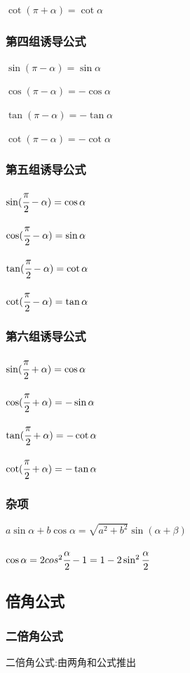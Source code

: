 \documentclass[UTF8,12pt]{ctexbook}
\begin{document}
{{{{    $\cot(\pi + \alpha) = \cot\alpha$
  }%

  \subsubsection{第四组诱导公式}{
    $\sin(\pi - \alpha) = \sin\alpha$

    $\cos(\pi - \alpha) = -\cos\alpha$

    $\tan(\pi - \alpha) = -\tan\alpha$

    $\cot(\pi - \alpha) = -\cot\alpha$
  }%

  \subsubsection{第五组诱导公式}{
    $\sin(\cfrac{\pi}{2} - \alpha) = \cos\alpha$

    $\cos(\cfrac{\pi}{2} - \alpha) = \sin\alpha$

    $\tan(\cfrac{\pi}{2} - \alpha) = \cot\alpha$

    $\cot(\cfrac{\pi}{2} - \alpha) = \tan\alpha$
  }%

  \subsubsection{第六组诱导公式}{
    $\sin(\cfrac{\pi}{2} + \alpha) = \cos\alpha$

    $\cos(\cfrac{\pi}{2} + \alpha) = -\sin\alpha$

    $\tan(\cfrac{\pi}{2} + \alpha) = -\cot\alpha$

    $\cot(\cfrac{\pi}{2} + \alpha) = -\tan\alpha$
  }%

  \subsubsection{杂项}{
    $a\sin\alpha + b\cos\alpha = \sqrt{a^2 + b^2}\sin(\alpha+\beta)$

    $\cos\alpha = 2cos^2\cfrac{\alpha}{2} - 1 = 1-2\sin^2\cfrac{\alpha}{2}$
  }%

}%

\subsection{倍角公式}{

  \subsubsection{二倍角公式}{
    二倍角公式:由两角和公式推出

}}}}
\end{document}

